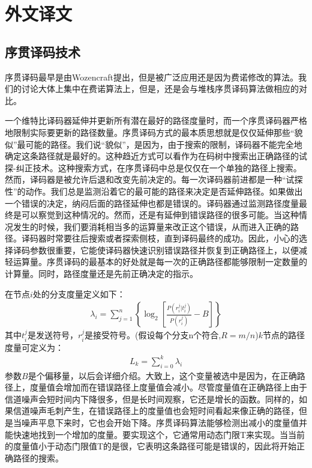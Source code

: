 \documentclass[twoside,numberorder]{buptthesis}
\begin{document}
\pagestyle{empty}
\chapter*{外\quad 文\quad 译\quad 文}
\thispagestyle{empty}
\section{序贯译码技术}
序贯译码最早是由Wozencraft提出，但是被广泛应用还是因为费诺修改的算法。我们的讨论大体上集中在费诺算法上，但是，还是会与堆栈序贯译码算法做相应的对比。

一个维特比译码器延伸并更新所有潜在最好的路径度量时，而一个序贯译码器严格地限制实际要更新的路径数量。序贯译码方式的最本质思想就是仅仅延伸那些“貌似”最可能的路径。我们说“貌似”，是因为，由于搜索的限制，译码器不能完全地确定这条路径就是最好的。这种趋近方式可以看作为在码树中搜索出正确路径的试探-纠正技术。这种搜索方式，在序贯译码中总是仅仅在一个单独的路径上搜索。然而，译码器是被允许后退和改变先前决定的。每一次译码器前进都是一种“试探性”的动作。我们总是监测沿着它的最可能的路径来决定是否延伸路径。如果做出一个错误的决定，纳闷后面的路径延伸也都是错误的。译码器通过监测路径度量最终是可以察觉到这种情况的。然而，还是有延伸到错误路径的很多可能。当这种情况发生的时候，我们要消耗相当多的运算量来改正这个错误，从而进入正确的路径。译码器时常要往后搜索或者探索侧枝，直到译码最终的成功。因此，小心的选择译码参数很重要，它能使译码器快速识别错误路径并恢复到正确路径上，以便减轻运算量。序贯译码的最基本的好处就是每一次的正确路径都能够限制一定数量的计算量。同时，路径度量还是先前正确决定的指示。

在节点$i$处的分支度量定义如下：
\begin{eqnarray}
  \lambda_i=\sum_{j=1}^n\left\{\log_2 \left[\frac{P(r_i^j|t_i^j)}{P(r_i^j)}-B\right]\right\}
  \label{equ:1}
\end{eqnarray}
其中$t_i^j$是发送符号，$r_i^j$是接受符号。(假设每个分支n个符合,$R=m/n$)$k$节点的路径度量可定义为：
\begin{eqnarray}
  L_k=\sum_{i=0}^k\lambda_i
  \label{equ:2}
\end{eqnarray}
参数$B$是个偏移量，以后会详细介绍。大致上，这个变量被选中是因为，在正确路径上，度量值会增加而在错误路径上度量值会减小。尽管度量值在正确路径上由于信道噪声会短时间内下降很多，但是长时间观察，它还是增长的函数。同样的，如果信道噪声毛刺产生，在错误路径上的度量值也会短时间看起来像正确的路径，但是当噪声平息下来时，它也会开始下降。序贯译码算法能够检测出减小的度量值并能快速地找到一个增加的度量。要实现这个，它通常用动态门限T来实现。当当前的度量值小于动态门限值T的是很，它表明这条路径可能是错误的，因此将开始正确路径的搜索。
\end{document}
